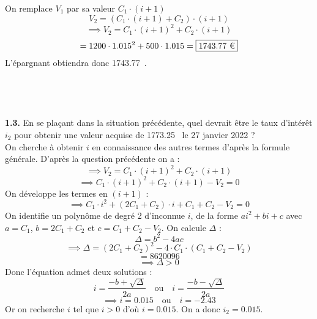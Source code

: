 \documentclass{article}
\begin{document}
On remplace $V_1$ par sa valeur $C_1 \cdot (i+1)$
$$ V_2 = (C_1 \cdot (i+1) + C_2)\cdot (i+1)$$
$$\implies V_2 = C_1 \cdot (i+1)^{2} + C_2 \cdot (i+1)$$
$$= 1200 \cdot 1.015^2 + 500 \cdot 1.015 = \boxed{1743.77 \text{ \texteuro}}$$
L'épargnant obtiendra donc 1743.77 \texteuro.
\\%
\\%
\\%
\\%
\\%
\textcolor{exogris}{\textbf{1.3.}
En se plaçant dans la situation précédente, quel devrait être le taux d’intérêt $i_2$ pour obtenir une valeur
acquise de 1773.25 \texteuro le 27 janvier 2022 ?
}%
\\%
On cherche à obtenir $i$ en connaissance des autres termes d'après la formule générale.
D'après la question précédente on a :
$$\implies V_2 = C_1 \cdot (i+1)^{2} + C_2 \cdot (i+1)$$
$$\implies C_1 \cdot (i+1)^2 + C_2 \cdot (i+1) - V_2 = 0$$
On développe les termes en $(i+1)$ :
$$\implies C_1 \cdot i^2 + (2C_1 + C_2) \cdot i + C_1 + C_2 - V_2 = 0$$
On identifie un polynôme de degré 2 d'inconnue $i$, de la forme $ai^2 + bi + c$ avec $a = C_1$, $b = 2C_1 + C_2$ et $c = C_1 + C_2 - V_2$.
%
On calcule $\Delta$ :
$$\Delta = b^2 - 4ac$$
$$\implies \Delta = (2C_1 + C_2)^2 - 4 \cdot C_1 \cdot (C_1 + C_2 - V_2)$$
$$= 8620096$$
$$\implies \Delta > 0$$
Donc l'équation admet deux solutions :
$$i = \dfrac{-b + \sqrt{\Delta}}{2a} \text{   ou   } i = \dfrac{-b - \sqrt{\Delta}}{2a}$$
$$\implies i = 0.015 \text{   ou   } i = -2.43$$
Or on recherche $i$ tel que $i > 0$ d'où $i = 0.015$.
On a donc $\boxed{i_2 = 0.015}.$

\end{document}
